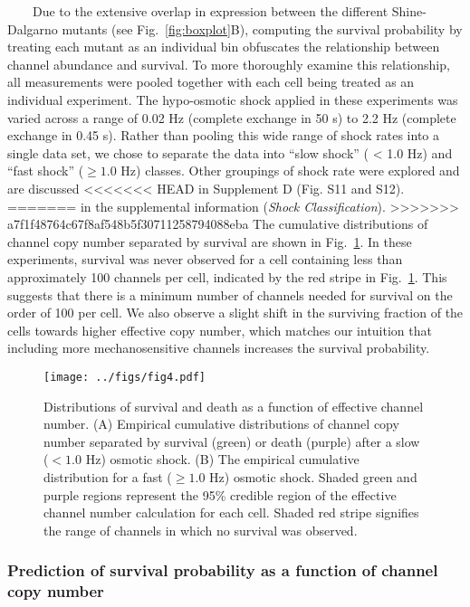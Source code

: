 ~~~~Due
to the
extensive
overlap
in
expression
between
the
different
Shine-Dalgarno
mutants
(see
Fig.~\ref{fig:boxplot}B),
computing
the
survival
probability
by
treating
each
mutant
as an
individual
bin
obfuscates
the
relationship
between
channel
abundance
and
survival.
To
more
thoroughly
examine
this
relationship,
all
measurements
were
pooled
together
with
each
cell
being
treated
as an
individual
experiment.
The
hypo-osmotic
shock
applied
in
these
experiments
was
varied
across
a
range
of
0.02
Hz
(complete
exchange
in 50
s) to
2.2 Hz
(complete
exchange
in
0.45
s).
Rather
than
pooling
this
wide
range
of
shock
rates
into a
single
data
set,
we
chose
to
separate
the
data
into
``slow
shock''
(
\textless{}
1.0
Hz)
and
``fast
shock''
(\(\geq 1.0\)
Hz)
classes.
Other
groupings
of
shock
rate
were
explored
and
are
discussed
<<<<<<< HEAD
in
Supplement
D
(Fig.
S11
and
S12).
=======
in the
supplemental
information
(\emph{Shock
Classification}).
>>>>>>> a7f1f48764c67f8af548b5f30711258794088eba
The
cumulative
distributions
of
channel
copy
number
separated
by
survival
are
shown
in
Fig.~\ref{fig:survival_dists}.
In
these
experiments,
survival
was
never
observed
for a
cell
containing
less
than
approximately
100
channels
per
cell,
indicated
by the
red
stripe
in
Fig.~\ref{fig:survival_dists}.
This
suggests
that
there
is a
minimum
number
of
channels
needed
for
survival
on the
order
of 100
per
cell.
We
also
observe
a
slight
shift
in the
surviving
fraction
of the
cells
towards
higher
effective
copy
number,
which
matches
our
intuition
that
including
more
mechanosensitive
channels
increases
the
survival
probability.

\begin{figure}
\centering
\texttt{[image: ../figs/fig4.pdf]}
\caption{Distributions
of
survival
and
death
as a
function
of
effective
channel
number.
(A)
Empirical
cumulative
distributions
of
channel
copy
number
separated
by
survival
(green)
or
death
(purple)
after
a slow
(\(< 1.0\)
Hz)
osmotic
shock.
(B)
The
empirical
cumulative
distribution
for a
fast
(\(\geq 1.0\)
Hz)
osmotic
shock.
Shaded
green
and
purple
regions
represent
the
95\%
credible
region
of the
effective
channel
number
calculation
for
each
cell.
Shaded
red
stripe
signifies
the
range
of
channels
in
which
no
survival
was
observed.}\label{fig:survival_dists}
\end{figure}

\subsubsection{Prediction
of
survival
probability
as a
function
of
channel
copy
number}\label{prediction-of-survival-probability-as-a-function-of-channel-copy-number}

